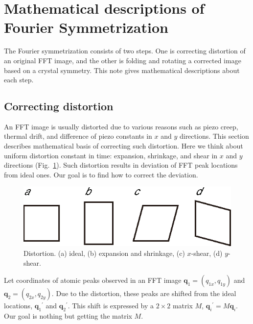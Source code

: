 \documentclass[a4paper]{article}
\begin{document}
\section*{Mathematical descriptions of Fourier Symmetrization}
The Fourier symmetrization consists of two steps.
One is correcting distortion of an original FFT image, and the other is folding and rotating a corrected image based on a crystal symmetry.
This note gives mathematical descriptions about each step.

\subsection*{Correcting distortion}
An FFT image is usually distorted due to various reasons such as piezo creep, thermal drift, and difference of piezo constants in $x$ and $y$ directions.
This section describes mathematical basis of correcting such distortion.
Here we think about uniform distortion constant in time: expansion, shrinkage, and shear in $x$ and $y$ directions (Fig.~\ref{fig:distortion}).
Such distortion results in deviation of FFT peak locations from ideal ones.
Our goal is to find how to correct the deviation.
\begin{figure}[h]
	\begin{center}
		\includegraphics[keepaspectratio]{distortion.eps}
	\end{center}
	\caption{Distortion. (a) ideal, (b) expansion and shrinkage, (c) $x$-shear, (d) $y$-shear.}
	\label{fig:distortion}
\end{figure}

Let coordinates of atomic peaks observed in an FFT image $\boldsymbol{q}_1 = (q_{1x}, q_{1y})$ and $\boldsymbol{q}_2 = (q_{2x}, q_{2y})$.
Due to the distortion, these peaks are shifted from the ideal locations, ${\boldsymbol{q}_1}^\prime$ and ${\boldsymbol{q}_2}^\prime$.
This shift is expressed by a $2\times 2$ matrix $M$, ${\boldsymbol{q}_i}^\prime = M\boldsymbol{q}_i$.
Our goal is nothing but getting the matrix $M$.
\end{document}
